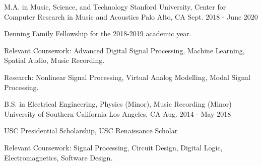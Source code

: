 

\begin{cventries}

    \cventry
    {M.A. in Music, Science, and Technology} %
    {Stanford University, Center for Computer Research in Music and Acoustics} %
    {Palo Alto, CA} %
    {Sept. 2018 - June 2020} %
    {
      \begin{cvitems} %
        \item {Denning Family Fellowship for the 2018-2019 academic year.}
        \item {Relevant Coursework: Advanced Digital Signal Processing, Machine Learning, Spatial Audio, Music Recording.}
        \item {Research: Nonlinear Signal Processing, Virtual Analog Modelling, Modal Signal Processing.}
      \end{cvitems}
    }

    \cventry
    {B.S. in Electrical Engineering, Physics (Minor), Music Recording (Minor)} %
    {University of Southern California} %
    {Los Angeles, CA} %
    {Aug. 2014 - May 2018} %
    {
      \begin{cvitems} %
        \item {USC Presidential Scholarship, USC Renaissance Scholar}
        \item {Relevant Coursework: Signal Processing, Circuit Design, Digital Logic, Electromagnetics, Software Design.}
      \end{cvitems}
    }

\end{cventries}
